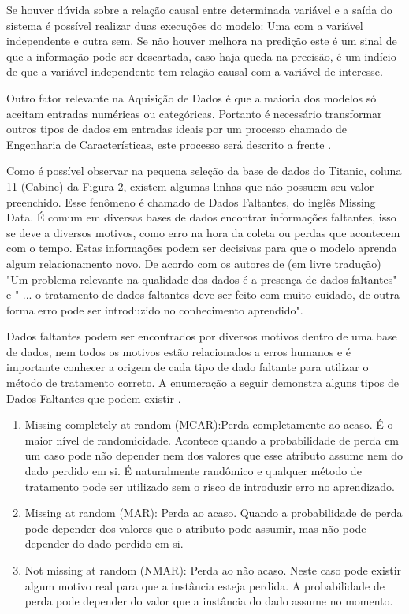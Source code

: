 Se houver dúvida sobre a relação causal entre determinada variável e a saída do sistema é possível realizar duas execuções do modelo: Uma com a variável independente e outra sem. Se não houver melhora na predição este é um sinal de que a informação pode ser descartada, caso haja queda na precisão, é um indício de que a variável independente tem relação causal com a variável de interesse.

Outro fator relevante na Aquisição de Dados é que a maioria dos modelos só aceitam entradas numéricas ou categóricas. Portanto é necessário transformar outros tipos de dados em entradas ideais por um processo chamado de Engenharia de Características, este processo será descrito a frente \cite{real2013}. 

Como é possível observar na pequena seleção da base de dados do Titanic, coluna 11 (Cabine) da Figura 2, existem algumas linhas que não possuem seu valor preenchido. Esse fenômeno é chamado de Dados Faltantes, do inglês Missing Data. É comum em diversas bases de dados encontrar informações faltantes, isso se deve a diversos motivos, como erro na hora da coleta ou perdas que acontecem com o tempo. Estas informações podem ser decisivas para que o modelo aprenda algum relacionamento novo. De acordo com os autores de  (em livre tradução) "Um problema relevante na qualidade dos dados é a presença de dados faltantes" e " ... o tratamento de dados faltantes deve ser feito com muito cuidado, de outra forma erro pode ser introduzido no conhecimento aprendido". 

Dados faltantes podem ser encontrados por diversos motivos dentro de uma base de dados, nem todos os motivos estão relacionados a erros humanos e é importante conhecer a origem de cada tipo de dado faltante para utilizar o método de tratamento correto. A enumeração a seguir demonstra alguns tipos de Dados Faltantes que podem existir \cite{stat1987}.

\begin{enumerate}
\item Missing completely at random (MCAR):Perda completamente ao acaso. É o maior nível de randomicidade. Acontece quando a probabilidade de perda em um caso pode não depender nem dos valores que esse atributo assume nem do dado perdido em si. É naturalmente randômico e qualquer método de tratamento pode ser utilizado sem o risco de introduzir erro no aprendizado.
\item Missing at random (MAR): Perda ao acaso. Quando a probabilidade de perda pode depender dos valores que o atributo pode assumir, mas não pode depender do dado perdido em si.
\item Not missing at random (NMAR): Perda ao não acaso. Neste caso pode existir algum motivo real para que a instância esteja perdida. A probabilidade de perda pode depender do valor que a instância do dado assume no momento.
\end{enumerate}

